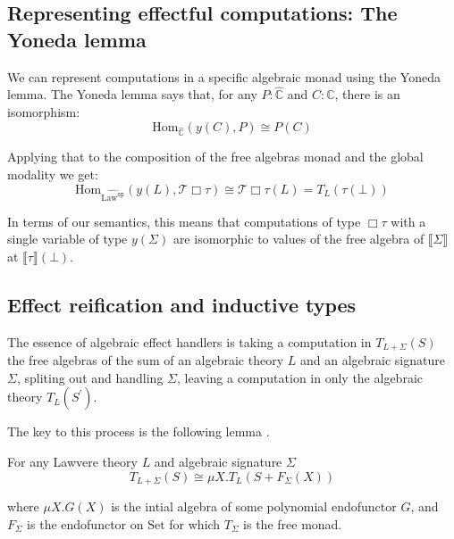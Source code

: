 \documentclass[acmsmall, screen, nonacm]{acmart}
\theoremstyle{definition}
\newcommand{\glob}{\mathop{\Box}}
\newcommand{\cat}{\mathbb{C}}
\newcommand{\catobj}{C}
\newcommand{\setc}{\mathrm{Set}}
\newcommand{\psh}{\widehat{\cat}}
\newcommand{\initial}{\bot}
\newcommand{\lawc}{\mathrm{Law}}
\newcommand{\lawcop}{\lawc^{\mathtt{op}}}
\newcommand{\pshlawcop}{\widehat{\lawcop}}
\newcommand{\yoneda}[1]{y(#1)}
\newcommand{\homset}[3]{\mathrm{Hom}_{#1}(#2, #3)}
\newcommand{\sem}[1]{\llbracket #1 \rrbracket}
\newcommand{\mon}{\mathcal{T}}
\newcommand{\types}{\mathrel{:}}
\begin{document}
\subsection{Representing effectful computations: The Yoneda lemma}

We can represent computations in a specific algebraic monad using the
Yoneda lemma. The Yoneda lemma says that, for any $P \types \psh$ and
$\catobj \types \cat$, there is an isomorphism:
\begin{equation*}
  \homset{\psh}{\yoneda{\catobj}}{P} \cong P(\catobj)
\end{equation*}

Applying that to the composition of the free algebras monad and the
global modality we get:
\begin{equation*}
  \homset{\pshlawcop}{\yoneda{L}}{\mon{\glob \tau}} \cong \mon{\glob \tau}(L) = T_L(\tau(\initial))
\end{equation*}

In terms of our semantics, this means that computations of type
$\glob \tau$ with a single variable of type $\yoneda{\Sigma}$ are
isomorphic to values of the free algebra of $\sem{\Sigma}$ at
$\sem{\tau}(\initial)$.

\subsection{Effect reification and inductive types}

The essence of algebraic effect handlers is taking a computation in
$T_{L + \Sigma}(S)$ the free algebras of the sum of an algebraic theory
$L$ and an algebraic signature $\Sigma$, spliting out and handling
$\Sigma$, leaving a computation in only the algebraic theory
$T_{L}(S^\prime)$.

The key to this process is the following lemma
\cite{hyland2006combining}.
\begin{lemma}
\label{lemma:sums}
  For any Lawvere theory $L$ and algebraic signature $\Sigma$
  \begin{equation*}
  T_{L + \Sigma}(S) \cong \mu X.T_L(S + F_\Sigma(X))
  \end{equation*}
\end{lemma}
where $\mu X.G(X)$ is the intial algebra of some polynomial endofunctor
$G$, and $F_\Sigma$ is the endofunctor on $\setc$ for which $T_{\Sigma}$
is the free monad.
\end{document}
